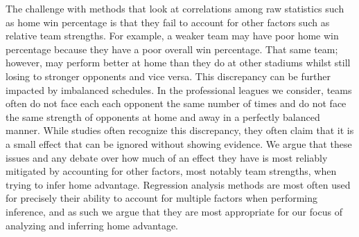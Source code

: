 The challenge with methods that look at correlations among raw statistics such as home win percentage is that they fail to account for other factors such as relative team strengths. For example, a weaker team may have poor home win percentage because they have a poor overall win percentage. That same team; however, may perform better at home than they do at other stadiums whilst still losing to stronger opponents and vice versa. This discrepancy can be further impacted by imbalanced schedules. In the professional leagues we consider, teams often do not face each each opponent the same number of times and do not face the same strength of opponents at home and away in a perfectly balanced manner. While studies often recognize this discrepancy, they often claim that it is a small effect that can be ignored \cite{Pollard2005a} without showing evidence. We argue that these issues and any debate over how much of an effect they have is most reliably mitigated by accounting for other factors, most notably team strengths, when trying to infer home advantage. Regression analysis methods are most often used for precisely their ability to account for multiple factors when performing inference, and as such we argue that they are most appropriate for our focus of analyzing and inferring home advantage.